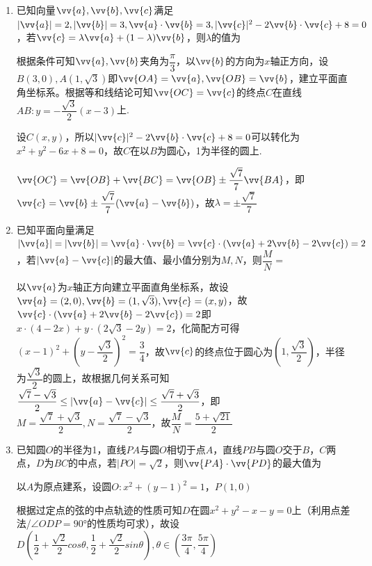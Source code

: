 \begin{enumerate}
    \item 已知向量$\vv{a}, \vv{b}, \vv{c}$满足$|\vv{a}| = 2, |\vv{b}| = 3, \vv{a} \cdot \vv{b} = 3, |\vv{c}|^2 - 2\vv{b} \cdot \vv{c} + 8 = 0$，若$\vv{c} = \lambda \vv{a} + (1-\lambda) \vv{b}$，则$\lambda$的值为
    \begin{jieda}
        根据条件可知$\vv{a}, \vv{b}$夹角为$\dfrac{\pi}{3}$，以$\vv{b}$的方向为$x$轴正方向，设$B(3, 0), A(1, \sqrt{3})$即$\vv{OA} = \vv{a}, \vv{OB} = \vv{b}$，建立平面直角坐标系。根据等和线结论可知$\vv{OC} = \vv{c}$的终点$C$在直线$AB: y = -\dfrac{\sqrt{3}}{2}(x-3)$上.
        
        设$C(x, y)$，所以$|\vv{c}|^2 - 2\vv{b} \cdot \vv{c} + 8 = 0$可以转化为$x^2+y^2 - 6x + 8 = 0$，故$C$在以$B$为圆心，1为半径的圆上.
        
        $\vv{OC} = \vv{OB} + \vv{BC} = \vv{OB} \pm \dfrac{\sqrt{7}}{7}\vv{BA}$，即$\vv{c} = \vv{b} \pm \dfrac{\sqrt{7}}{7}(\vv{a} - \vv{b})$，故$\lambda = \pm \dfrac{\sqrt{7}}{7}$
    \end{jieda}

    \item 已知平面向量满足$|\vv{a}| = |\vv{b}| = \vv{a} \cdot \vv{b} = \vv{c} \cdot (\vv{a} + 2\vv{b}-2\vv{c}) = 2$，若$|\vv{a} - \vv{c}|$的最大值、最小值分别为$M, N$，则$\dfrac{M}{N} = $
    \begin{jieda}
        以$\vv{a}$为$x$轴正方向建立平面直角坐标系，故设$\vv{a} = (2, 0), \vv{b} = (1, \sqrt{3}), \vv{c} = (x, y)$，故$\vv{c} \cdot (\vv{a} + 2\vv{b}-2\vv{c}) = 2$即$x \cdot (4-2x) + y \cdot (2\sqrt{3} - 2y) = 2$，化简配方可得$(x-1)^2 + (y - \dfrac{\sqrt{3}}{2})^2 = \dfrac{3}{4}$，故$\vv{c}$的终点位于圆心为$(1, \dfrac{\sqrt{3}}{2})$，半径为$\dfrac{\sqrt{3}}{2}$的圆上，故根据几何关系可知$\dfrac{\sqrt{7} - \sqrt{3}}{2} \leq |\vv{a} - \vv{c}| \leq \dfrac{\sqrt{7} + \sqrt{3}}{2}$，即$M = \dfrac{\sqrt{7}+\sqrt{3}}{2}, N = \dfrac{\sqrt{7} - \sqrt{3}}{2}$，故$\dfrac{M}{N} = \dfrac{5+\sqrt{21}}{2}$
    \end{jieda}
    
    \item 已知圆$O$的半径为1，直线$PA$与圆$O$相切于点$A$，直线$PB$与圆$O$交于$B$，$C$两点，$D$为$BC$的中点，若$|PO| = \sqrt{2}$，则$\vv{PA} \cdot \vv{PD}$的最大值为
    \begin{jieda}
        以$A$为原点建系，设圆$O:x^2+(y-1)^2 = 1$，$P(1, 0)$

        根据过定点的弦的中点轨迹的性质可知$D$在圆$x^2 + y^2 - x - y = 0$上（利用点差法/$\angle ODP = \ang{90}$的性质均可求），故设$D\left(\dfrac{1}{2}+\dfrac{\sqrt{2}}{2}cos\theta, \dfrac{1}{2}+\dfrac{\sqrt{2}}{2}sin\theta\right), \theta \in \left(\dfrac{3\pi}{4}, \dfrac{5\pi}{4}\right)$
        

\end{jieda}
\end{enumerate}
